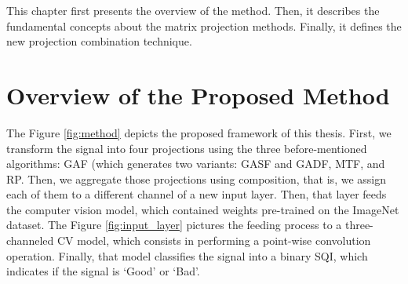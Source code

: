 


This chapter first presents the overview of the method. Then, it describes the fundamental concepts about the matrix projection methods. Finally, it defines the new projection combination technique.

\section{Overview of the Proposed Method}

The Figure \ref{fig:method} depicts the proposed framework of this thesis. First, we transform the signal into four projections using the three before-mentioned algorithms: \gls{GAF} (which generates two variants: \gls{GASF} and \gls{GADF}, \gls{MTF}, and \gls{RP}. Then, we aggregate those projections using composition, that is, we assign each of them to a different channel of a new input layer. Then, that layer feeds the computer vision model, which contained weights pre-trained on the ImageNet dataset. The Figure \ref{fig:input_layer} pictures the feeding process to a three-channeled \gls{CV} model, which consists in performing a point-wise convolution operation. Finally, that model classifies the signal into a binary \gls{SQI}, which indicates if the signal is `Good' or `Bad'. 

